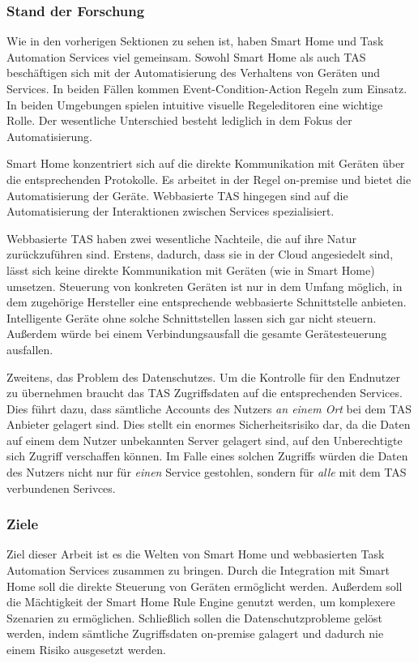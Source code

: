 \documentclass[12pt]{article}
\begin{document}
\subsubsection{Stand der Forschung}
\label{sdf}
Wie in den vorherigen Sektionen zu sehen ist, haben Smart Home und Task Automation Services viel gemeinsam. Sowohl Smart Home als auch TAS beschäftigen sich mit der Automatisierung des Verhaltens von Geräten und Services. In beiden Fällen kommen Event-Condition-Action Regeln zum Einsatz. In beiden Umgebungen spielen intuitive visuelle Regeleditoren eine wichtige Rolle. Der wesentliche Unterschied besteht lediglich in dem Fokus der Automatisierung.

Smart Home konzentriert sich auf die direkte Kommunikation mit Geräten über die entsprechenden Protokolle. Es arbeitet in der Regel on-premise und bietet die Automatisierung der Geräte. Webbasierte TAS hingegen sind auf die Automatisierung der Interaktionen zwischen Services spezialisiert.

Webbasierte TAS haben zwei wesentliche Nachteile, die auf ihre Natur zurückzuführen sind. Erstens, dadurch, dass sie in der Cloud angesiedelt sind, lässt sich keine direkte Kommunikation mit Geräten (wie in Smart Home) umsetzen. Steuerung von konkreten Geräten ist nur in dem Umfang möglich, in dem zugehörige Hersteller eine entsprechende webbasierte Schnittstelle anbieten. Intelligente Geräte ohne solche Schnittstellen lassen sich gar nicht steuern. Außerdem würde bei einem Verbindungsausfall die gesamte Gerätesteuerung ausfallen.

Zweitens, das Problem des Datenschutzes. Um die Kontrolle für den Endnutzer zu übernehmen braucht das TAS Zugriffsdaten auf die entsprechenden Services. Dies führt dazu, dass sämtliche Accounts des Nutzers \textit{an einem Ort} bei dem TAS Anbieter gelagert sind. Dies stellt ein enormes Sicherheitsrisiko dar, da   die Daten auf einem dem Nutzer unbekannten Server gelagert sind, auf den Unberechtigte sich Zugriff verschaffen können. Im Falle eines solchen Zugriffs würden die Daten des Nutzers nicht nur für \textit{einen} Service gestohlen, sondern für \textit{alle} mit dem TAS verbundenen Serivces.


\subsubsection{Ziele}
\label{Ziele}
Ziel dieser Arbeit ist es die Welten von Smart Home und webbasierten Task Automation Services zusammen zu bringen. Durch die Integration mit Smart Home soll die direkte Steuerung von Geräten ermöglicht werden. Außerdem soll die Mächtigkeit der Smart Home Rule Engine genutzt werden, um komplexere Szenarien zu ermöglichen. Schließlich sollen die Datenschutzprobleme gelöst werden, indem sämtliche Zugriffsdaten on-premise galagert und dadurch nie einem Risiko ausgesetzt werden.
\end{document}
